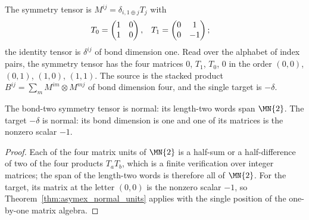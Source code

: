 \begin{definition}
    \label{def:asymex_czx_tensors}
    \leanok
    The symmetry tensor is $M^{ij}=\delta_{i,1\oplus j}T_j$ with
    \begin{align}
        T_0 & =\begin{pmatrix}1&0\\1&0\end{pmatrix},
            &
        T_1 & =\begin{pmatrix}0&1\\0&-1\end{pmatrix};
        \notag
    \end{align}
    the identity tensor is $\delta^{ij}$ of bond dimension one. Read over
    the alphabet of index pairs, the symmetry tensor has the four matrices
    $0$, $T_1$, $T_0$, $0$ in the order $(0,0)$, $(0,1)$, $(1,0)$, $(1,1)$.
    The source is the stacked product
    $B^{ij}=\sum_mM^{im}\otimes M^{mj}$ of bond dimension four, and the
    single target is $-\delta$.
\end{definition}

\begin{theorem}
    \label{thm:asymex_czx_normal}
    \leanok
    The bond-two symmetry tensor is normal: its length-two words span
    $\MN{2}$. The target $-\delta$ is normal: its bond dimension is one and
    one of its matrices is the nonzero scalar $-1$.
\end{theorem}

\begin{proof}
    \leanok
    Each of the four matrix units of $\MN{2}$ is a half-sum or a
    half-difference of two of the four products $T_aT_b$, which is a finite
    verification over integer matrices; the span of the length-two words is
    therefore all of $\MN{2}$. For the target, its matrix at the letter
    $(0,0)$ is the nonzero scalar $-1$, so
    Theorem~\ref{thm:asymex_normal_units} applies with the single position
    of the one-by-one matrix algebra.
\end{proof}

